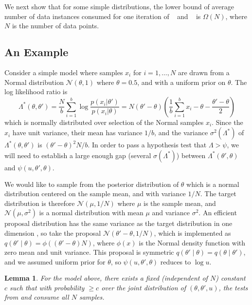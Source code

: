 \documentclass{article}
\newtheorem{lemma}{Lemma}
\begin{document}
We next show that for some simple distributions, the lower
bound of average number of data instances consumed for one iteration of
~\cite{cutting_mh_2014} and ~\cite{icml2014c1_bardenet14} is
$\Omega(N)$, where $N$ is the number of data points.

\subsection{An Example}
Consider a simple model where samples $x_i$ for $i=1,\ldots,N$ are
drawn from a Normal distribution $\mathcal{N}(\theta,1)$ where
$\theta=0.5$, and with a uniform prior on $\theta$. The log likelihood ratio is
\begin{equation}
\Lambda^*(\theta,\theta') =  \frac{N}{b}\sum_{i=1}^b \log\frac{p(x_i|\theta')}{p(x_i|\theta)}=
  N(\theta'-\theta)\left(\frac{1}{b}\sum_{i=1}^b x_i-\theta-\frac{\theta'-\theta}{2}\right)
\end{equation}
which is normally distributed over selection of the Normal samples $x_i$.
Since the $x_i$ have unit variance, their mean has variance $1/b$, and the variance $\sigma^2(\Lambda^*)$
of $\Lambda^*(\theta,\theta')$ is $(\theta'-\theta)^2N/b$. In order to pass
a hypothesis test that $\Lambda > \psi$, we will need to establish a
large enough gap (several $\sigma(\Lambda^*)$) between $\Lambda^*(\theta',\theta)$
and $\psi(u,\theta',\theta)$.

We would like to sample from the posterior distribution of $\theta$
which is a normal distribution centered on the sample mean, and with
variance $1/N$.  The target distribution is therefore
$\mathcal{N}(\mu,1/N)$ where $\mu$ is the sample mean, and $\mathcal{N}(\mu,\sigma^2)$ is a
normal distribution with mean $\mu$ and variance $\sigma^2$.  An efficient
proposal distribution has the same variance as the target distribution in one dimension
\cite{OptimalScaling01}, so take the proposal
$\mathcal{N}(\theta'-\theta,1/N)$, which is implemented as $q(\theta'\mid\theta) =
\phi((\theta'-\theta)N)$, where $\phi(x)$ is the Normal density
function with zero mean and unit variance. This proposal is symmetric
$q(\theta'\mid\theta)=q(\theta\mid\theta')$, and we assumed uniform
prior for $\theta$, so $\psi(u,\theta',\theta)$ reduces to $\log
u$.

\begin{lemma}\label{lem:efficienty_cutting}
  For the model above, there
  exists a fixed (independent of $N$) constant $c$ such that with probability $ \geq c$ over the joint
  distribution of $(\theta, \theta', u)$, the
  tests from \cite{icml2014c1_bardenet14} and \cite{cutting_mh_2014} consume all $N$ samples. 
\end{lemma}
\end{document}
